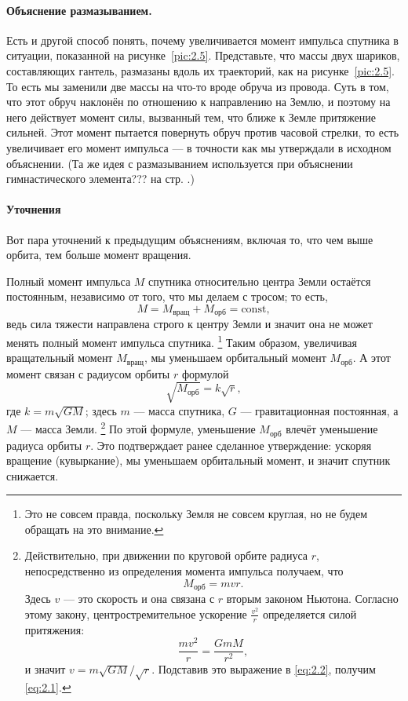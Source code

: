 \paragraph{Объяснение размазыванием.}
Есть и другой способ понять, почему увеличивается момент импульса спутника в ситуации, показанной на рисунке~\ref{pic:2.5}.
Представьте, что массы двух шариков, составляющих гантель, размазаны вдоль их траекторий,
как на рисунке~\ref{pic:2.5}.
То есть мы заменили две массы на что-то вроде обруча из провода.
Суть в том, что этот обруч наклонён по отношению к направлению на Землю, и поэтому на него действует момент  силы, вызванный тем, что ближе к Земле притяжение сильней.
Этот момент пытается повернуть обруч против часовой стрелки,
то есть увеличивает его момент импульса — в точности как мы утверждали в исходном объяснении.
(Та же идея с размазыванием используется при объяснении гимнастического элемента??? на стр. \pageref{???}.)

\paragraph*{Уточнения}
Вот пара уточнений к предыдущим объяснениям, включая то, что чем выше орбита, тем больше момент вращения.

Полный момент импульса $M$ спутника относительно центра Земли остаётся постоянным, независимо от того, что мы делаем с тросом; то есть,
\[
M = M_{\text{вращ}} + M_{\text{орб}} = \mathrm{const},
\]
ведь сила тяжести направлена строго к центру Земли и значит она не может менять полный момент импульса спутника.%
\footnote{Это не совсем правда, поскольку Земля не совсем круглая, но не будем обращать на это внимание.}
Таким образом, увеличивая вращательный момент $M_{\text{вращ}}$, мы уменьшаем орбитальный момент $M_{\text{орб}}$.
А этот момент связан с радиусом орбиты $r$ формулой
\begin{equation}
\sqrt{M_{\text{орб}}} = k \sqrt{r}, \label{eq:2.1}
\end{equation}
где $k = m \sqrt{G M}$; здесь $m$ --- масса спутника, $G$ --- гравитационная постоянная, а $M$ --- масса Земли.%
\footnote{Действительно, при движении по круговой орбите радиуса $r$, непосредственно из определения момента импульса получаем, что
\begin{equation}
M_{\text{орб}} = m v r. \label{eq:2.2}
\end{equation}
Здесь $v$ — это скорость и она связана с $r$ вторым законом Ньютона.
Согласно этому закону, центростремительное ускорение $\frac{v^2}{r}$ определяется силой притяжения:
\[
\frac{m  v^2}{r} = \frac{G m M}{r^2},
\]
и значит
$v = m  \sqrt{G M}/\sqrt{r}$.
Подставив это выражение в \eqref{eq:2.2}, получим \eqref{eq:2.1}.}
По этой формуле, уменьшение $M_{\text{орб}}$ влечёт уменьшение радиуса орбиты $r$.
Это подтверждает ранее сделанное утверждение: ускоряя вращение (кувыркание), мы уменьшаем орбитальный момент, и значит спутник снижается.

